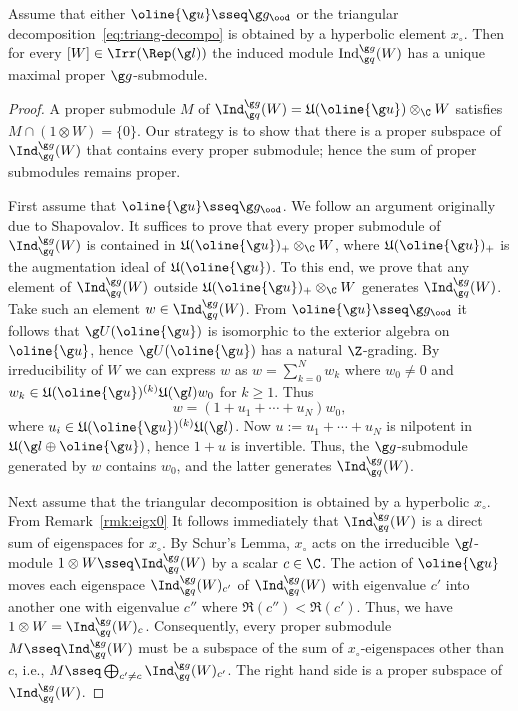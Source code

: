 \documentclass[12pt]{amsart}
\begin{document}
\begin{lem}
\label{lem:uniquemaxx0}
Assume that either $\oline{\g u}\sseq \g g_\ood$ or  the triangular decomposition~\eqref{eq:triang-decompo} is obtained by a hyperbolic element $x_\circ$. 
Then
for every 
$[W]\in\Irr(\Rep(\g l))$ the induced module
 $
\mathrm{Ind}_{\g q}^{\g g}(W)$ has a unique maximal proper $\g g$-submodule.
\end{lem} 
\begin{proof}
A proper submodule $M$ of  $\Ind_{\g q}^{\g g}(W)=\mathfrak U(\oline{\g u})\otimes_\C W$ satisfies $M\cap (1\otimes W)=\{0\}$. Our strategy is to show that there is a proper subspace of $\Ind_{\g q}^{\g g}(W)$ that contains  every proper submodule; hence  the sum of proper submodules remains proper.

First assume that $\oline{\g u}\sseq \g g_\ood$. We follow an argument originally due to Shapovalov. It suffices to  prove that every proper submodule of $\Ind_{\g q}^{\g g}(W)$ is contained in  $\mathfrak U(\oline{\g u})_+\otimes_\C W$, where $\mathfrak U(\oline{\g u})_+$ is the augmentation ideal of $\mathfrak U(\oline{\g u})$. To this end, we prove that any element of $\Ind_{\g q}^{\g g}(W)$ outside $\mathfrak U(\oline{\g u})_+\otimes_\C W$ generates $\Ind_{\g q}^{\g g}(W)$.  Take such an element 
$w\in \Ind_{\g q}^{\g g}(W)$. 
From $\oline{\g u}\sseq \g g_\ood$ it follows that $\g U(\oline{\g u})$ is isomorphic to the exterior algebra on $\oline{\g u}$, hence $\g U(\oline{\g u})$ has a natural $\Z$-grading.
By irreducibility of $W$ we can express $w$ as $w=\sum_{k=0}^N w_k$ where $w_0\neq 0$ and $w_k\in \mathfrak U(\oline{\g u})^{(k)}\mathfrak U(\g l)w_0 $
for $k\geq 1$. Thus \[
w=(1+u_1+\cdots +u_N)w_0,
\] where $u_i\in \mathfrak U(\oline{\g u})^{(k)}\mathfrak U(\g l)$. Now $u:=u_1+\cdots+u_N$ is nilpotent in $\mathfrak U(\g l\oplus \oline{\g u})$, hence $1+u$ is invertible. Thus, the $\g g$-submodule generated by $w$ contains $w_0$, and the latter generates $\Ind_{\g q}^{\g g}(W)$.  

Next assume that the triangular decomposition is obtained by a hyperbolic $x_\circ$. From Remark~\ref{rmk:eigx0} It follows immediately that $\Ind_{\g q}^{\g g}(W)$ is a direct sum of eigenspaces for $x_\circ$.   By Schur's Lemma, $x_\circ$ acts on  the irreducible $\g l$-module $1\otimes W\sseq \Ind_{\g q}^{\g g}(W)$ by a scalar $c\in\C$.
The action of $\oline{\g u}$ moves each eigenspace $\Ind_{\g q}^{\g g}(W)_{c'}$ 
of $\Ind_{\g q}^{\g g}(W)$
with eigenvalue $c'$ into another one with eigenvalue $c''$ where $\Re(c'')<\Re(c')$. Thus, we have $1\otimes W=\Ind_{\g q}^{\g g}(W)_c$. Consequently, 
 every proper submodule  $M\sseq \Ind_{\g q}^{\g g}(W)$ must be a subspace of the sum of $x_\circ$-eigenspaces other than $c$, i.e.,
$
\textstyle M\sseq \bigoplus_{c'\neq c}\Ind_{\g q}^{\g g}(W)_{c'}$. 
The right hand side is a proper subspace of  $\Ind_{\g q}^{\g g}(W)$.
\end{proof}
\end{document}
